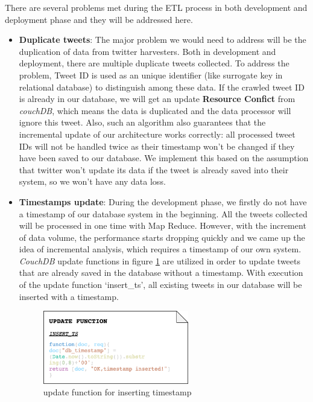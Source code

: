 \documentclass{article}
\begin{document}
There are several problems met during the ETL process in both development and deployment phase and they will be addressed here.
\begin{itemize}
    \item \textbf{Duplicate tweets}: The major problem we would need to address will be the duplication of data from twitter harvesters. Both in development and deployment, there are multiple duplicate tweets collected. To address the problem, Tweet ID is used as an unique identifier (like surrogate key in relational database) to distinguish among these data. If the crawled tweet ID is already in our database, we will get an update \textbf{Resource Confict} from \textit{couchDB}, which means the data is duplicated and the data processor will ignore this tweet. Also, such an algorithm also guarantees that the incremental update of our architecture works correctly: all processed tweet IDs will not be handled twice as their timestamp won’t be changed if they have been saved to our database. We implement this based on the assumption that twitter won’t update its data if the tweet is already saved into their system, so we won’t have any data loss.

    \item \textbf{Timestamps update}: During the development phase, we firstly do not have a timestamp of our database system in the beginning. All the tweets collected will be processed in one time with Map Reduce. However, with the increment of data volume, the performance starts dropping quickly and we came up the idea of incremental analysis, which requires a timestamp of our own system. \textit{CouchDB} update functions in figure \ref{fig:insertts} are utilized in order to update tweets that are already saved in the database without a timestamp. With execution of the update function ‘insert\_ts’, all existing tweets in our database will be inserted with a timestamp.
\begin{figure}
\centering
\includegraphics[width=0.6\textwidth]{img/insert_ts.png}
\caption{update function for inserting timestamp}
\label{fig:insertts}
\end{figure}
\end{itemize}
\end{document}
